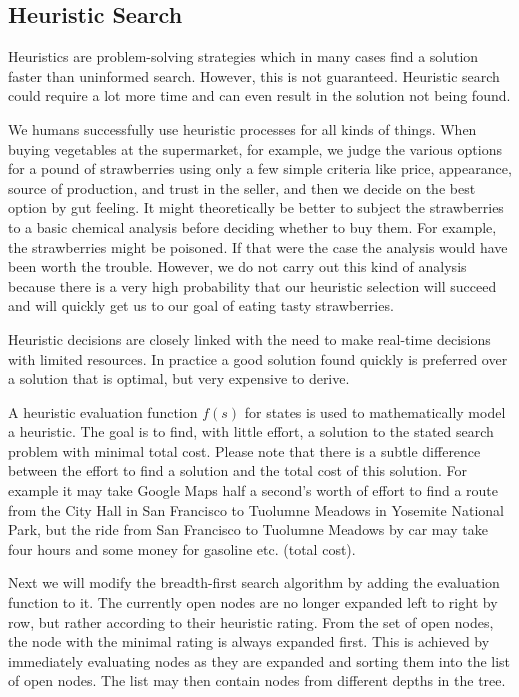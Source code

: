 \documentclass[10pt]{book}
\begin{document}
\subsection*{Heuristic Search}
Heuristics are problem-solving strategies which in many cases find a solution faster than uninformed search. However, this is not guaranteed. Heuristic search could require a lot more time and can even result in the solution not being found.

We humans successfully use heuristic processes for all kinds of things. When buying vegetables at the supermarket, for example, we judge the various options for a pound of strawberries using only a few simple criteria like price, appearance, source of production, and trust in the seller, and then we decide on the best option by gut feeling. It might theoretically be better to subject the strawberries to a basic chemical analysis before deciding whether to buy them. For example, the strawberries might be poisoned. If that were the case the analysis would have been worth the trouble. However, we do not carry out this kind of analysis because there is a very high probability that our heuristic selection will succeed and will quickly get us to our goal of eating tasty strawberries.


Heuristic decisions are closely linked with the need to make real-time decisions with limited resources. In practice a good solution found quickly is preferred over a solution that is optimal, but very expensive to derive.

A heuristic evaluation function $f(s)$ for states is used to mathematically model a heuristic. The goal is to find, with little effort, a solution to the stated search problem with minimal total cost. Please note that there is a subtle difference between the effort to find a solution and the total cost of this solution. For example it may take Google Maps half a second's worth of effort to find a route from the City Hall in San Francisco to Tuolumne Meadows in Yosemite National Park, but the ride from San Francisco to Tuolumne Meadows by car may take four hours and some money for gasoline etc. (total cost).

Next we will modify the breadth-first search algorithm by adding the evaluation function to it. The currently open nodes are no longer expanded left to right by row, but rather according to their heuristic rating. From the set of open nodes, the node with the minimal rating is always expanded first. This is achieved by immediately evaluating nodes as they are expanded and sorting them into the list of open nodes. The list may then contain nodes from different depths in the tree.
\end{document}
